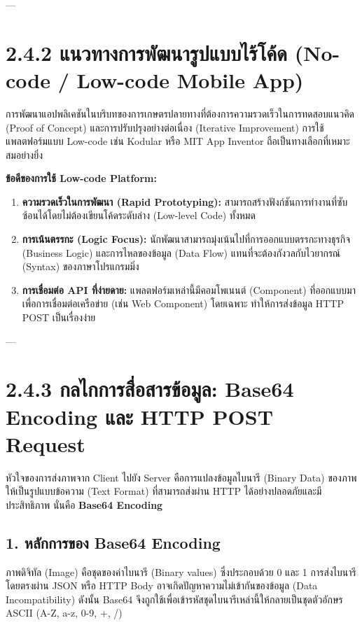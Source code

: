 \documentclass[11pt,a4paper,openany]{report}
\begin{document}
---

\section{2.4.2 แนวทางการพัฒนารูปแบบไร้โค้ด (No-code / Low-code Mobile App)}


การพัฒนาแอปพลิเคชันในบริบทของการเกษตรปลายทางที่ต้องการความรวดเร็วในการทดสอบแนวคิด (Proof of Concept) และการปรับปรุงอย่างต่อเนื่อง (Iterative Improvement) การใช้แพลตฟอร์มแบบ Low-code เช่น Kodular หรือ MIT App Inventor ถือเป็นทางเลือกที่เหมาะสมอย่างยิ่ง

\textbf{ข้อดีของการใช้ Low-code Platform:}
\begin{enumerate}
  \item \textbf{ความรวดเร็วในการพัฒนา (Rapid Prototyping):} สามารถสร้างฟังก์ชันการทำงานที่ซับซ้อนได้โดยไม่ต้องเขียนโค้ดระดับล่าง (Low-level Code) ทั้งหมด
  \item \textbf{การเน้นตรรกะ (Logic Focus):} นักพัฒนาสามารถมุ่งเน้นไปที่การออกแบบตรรกะทางธุรกิจ (Business Logic) และการไหลของข้อมูล (Data Flow) แทนที่จะต้องกังวลกับไวยากรณ์ (Syntax) ของภาษาโปรแกรมมิ่ง
  \item \textbf{การเชื่อมต่อ API ที่ง่ายดาย:} แพลตฟอร์มเหล่านี้มีคอมโพเนนต์ (Component) ที่ออกแบบมาเพื่อการเชื่อมต่อเครือข่าย (เช่น Web Component) โดยเฉพาะ ทำให้การส่งข้อมูล HTTP POST เป็นเรื่องง่าย
\end{enumerate}


---

\section{2.4.3 กลไกการสื่อสารข้อมูล: Base64 Encoding และ HTTP POST Request}


หัวใจของการส่งภาพจาก Client ไปยัง Server คือการแปลงข้อมูลไบนารี (Binary Data) ของภาพให้เป็นรูปแบบข้อความ (Text Format) ที่สามารถส่งผ่าน HTTP ได้อย่างปลอดภัยและมีประสิทธิภาพ นั่นคือ \textbf{Base64 Encoding}

\subsection{1. หลักการของ Base64 Encoding}

ภาพดิจิทัล (Image) คือชุดของค่าไบนารี (Binary values) ซึ่งประกอบด้วย 0 และ 1 การส่งไบนารีโดยตรงผ่าน JSON หรือ HTTP Body อาจเกิดปัญหาความไม่เข้ากันของข้อมูล (Data Incompatibility) ดังนั้น Base64 จึงถูกใช้เพื่อเข้ารหัสชุดไบนารีเหล่านี้ให้กลายเป็นชุดตัวอักษร ASCII (A-Z, a-z, 0-9, +, /)
\end{document}
